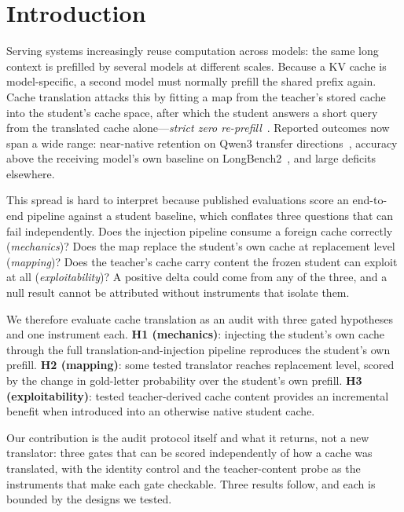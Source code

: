 \documentclass[10pt]{article}
\newcommand{\kv}{\ensuremath{\mathrm{KV}}}
\begin{document}

\section{Introduction}
\label{sec:intro}

Serving systems increasingly reuse computation across models: the same long
context is prefilled by several models at different scales. Because a \kv{}
cache is model-specific, a second model must normally prefill the shared prefix
again. Cache translation attacks this by fitting a map from the teacher's stored
cache into the student's cache space, after which the student answers a short
query from the translated cache alone---\emph{strict zero
re-prefill}~\citep{c2c2025,lsc2026,mot2026,heo2026,cachebridge2026,contextreuse2026}.
Reported outcomes now span a wide range: near-native retention on Qwen3
transfer directions~\citep{cachebridge2026}, accuracy above the receiving
model's own baseline on LongBench2~\citep{contextreuse2026}, and large deficits
elsewhere.

This spread is hard to interpret because published evaluations score an
end-to-end pipeline against a student baseline, which conflates three questions
that can fail independently. Does the injection pipeline consume a foreign
cache correctly (\emph{mechanics})? Does the map replace the student's own cache
at replacement level (\emph{mapping})? Does the teacher's cache carry content
the frozen student can exploit at all (\emph{exploitability})? A positive delta
could come from any of the three, and a null result cannot be attributed
without instruments that isolate them.

We therefore evaluate cache translation as an audit with three gated
hypotheses and one instrument each.
\textbf{H1 (mechanics)}: injecting the student's own cache through the full
translation-and-injection pipeline reproduces the student's own prefill.
\textbf{H2 (mapping)}: some tested translator reaches replacement level, scored
by the change in gold-letter probability over the student's own prefill.
\textbf{H3 (exploitability)}: tested teacher-derived cache content provides an
incremental benefit when introduced into an otherwise native student cache.

Our contribution is the audit protocol itself and what it returns, not a new
translator: three gates that can be scored independently of how a cache was
translated, with the identity control and the teacher-content probe as the
instruments that make each gate checkable. Three results follow, and each is
bounded by the designs we tested.
\end{document}
